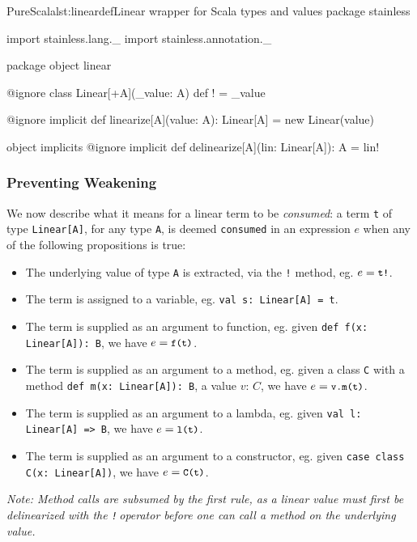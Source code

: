 \documentclass[a4paper,twoside]{article}
\newcommand{\stt}[1]{\texttt{\small{#1}}}
\begin{document}
\begin{enumerate}
\begin{Code}{PureScala}{lst:lineardef}{Linear wrapper for Scala types and values}
package stainless

import stainless.lang._
import stainless.annotation._

package object linear {

  @ignore
  class Linear[+A](_value: A) {
    def ! = _value
  }
  
  @ignore
  implicit def linearize[A](value: A): Linear[A] = new Linear(value)
  
  object implicits {
    @ignore
    implicit def delinearize[A](lin: Linear[A]): A = lin!
  }
}
\end{Code}

\subsubsection*{Preventing Weakening}

We now describe what it means for a linear term to be \textit{consumed}: a term \stt{t} of type \stt{Linear[A]}, for any type \stt{A}, is deemed \stt{consumed} in an expression $e$ when any of the following propositions is true:

\begin{itemize}
\item The underlying value of type \stt{A} is extracted, via the \stt{!} method, eg. $e = \stt{t!}$.
\item The term is assigned to a variable, eg. \stt{val s:\,Linear[A] = t}.
\item The term is supplied as an argument to function, eg. given \stt{def f(x:\,Linear[A]):\,B}, we have $e = \stt{f(t)}$.
\item The term is supplied as an argument to a method, eg. given a class \stt{C} with a method \stt{def m(x:\,Linear[A]):\,B}, a value $v:\, C$, we have $e = \stt{v.m(t)}$.
\item The term is supplied as an argument to a lambda, eg. given \stt{val l:\,Linear[A] => B}, we have $e = \stt{l(t)}$.
\item The term is supplied as an argument to a constructor, eg. given \stt{case class C(x: Linear[A])}, we have $e = \stt{C(t)}$.
\end{itemize}

\textit{Note: Method calls are subsumed by the first rule, as a linear value must first be delinearized with the \stt{!}\,operator before one can call a method on the underlying value.}\\


\end{enumerate}
\end{document}
